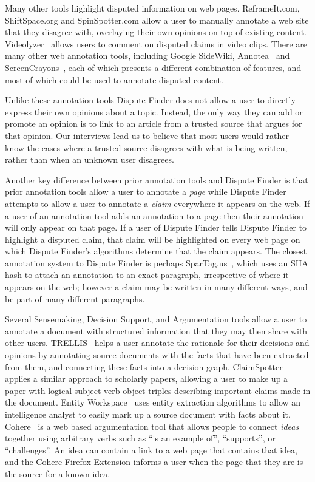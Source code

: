 \documentclass{www2010-submission}
\begin{document}
Many other tools highlight disputed information on web pages. ReframeIt.com, ShiftSpace.org and SpinSpotter.com allow a user to manually annotate a web site that they disagree with, overlaying their own opinions on top of existing content. Videolyzer~\cite{Diakopoulos2008} allows users to comment on disputed claims in video clips. There are many other web annotation tools, including Google SideWiki, Annotea~\cite{Koivunen2001} and ScreenCrayons~\cite{Olsen2004}, each of which presents a different combination of features, and most of which could be used to annotate disputed content.

Unlike these annotation tools Dispute Finder does not allow a user to directly express their own opinions about a topic. Instead, the only way they can add or promote an opinion is to link to an article from a trusted source that argues for that opinion. Our interviews lead us to believe that most users would rather know the cases where a trusted source disagrees with what is being written, rather than when an unknown user disagrees.

Another key difference between prior annotation tools and Dispute Finder is that prior annotation tools allow a user to annotate a {\it page} while Dispute Finder attempts to allow a user to annotate a {\it claim} everywhere it appears on the web. If a user of an annotation tool adds an annotation to a page then their annotation will only appear on that page. If a user of Dispute Finder tells Dispute Finder to highlight a disputed claim, that claim will be highlighted on every web page on which Dispute Finder's algorithms determine that the claim appears. The closest annotation system to Dispute Finder is perhaps SparTag.us~\cite{Hong2009}, which uses an SHA hash to attach an annotation to an exact paragraph, irrespective of where it appears on the web; however a claim may be written in many different ways, and be part of many different paragraphs.

Several Sensemaking, Decision Support, and Argumentation tools allow a user to annotate a document with structured information that they may then share with other users. TRELLIS~\cite{Gil2002} helps a user annotate the rationale for their decisions and opinions by annotating source documents with the facts that have been extracted from them, and connecting these facts into a decision graph. ClaimSpotter~\cite{Sereno2005,Sereno2004} applies a similar approach to scholarly papers, allowing a user to make up a paper with logical subject-verb-object triples describing important claims made in the document. Entity Workspace~\cite{Bier2006} uses entity extraction algorithms to allow an intelligence analyst to easily mark up a source document with facts about it. Cohere~\cite{Shum2008} is a web based argumentation tool that allows people to connect {\it ideas} together using arbitrary verbs such as ``is an example of'', ``supports'', or ``challenges''. An idea can contain a link to a web page that contains that idea, and the Cohere Firefox Extension informs a user when the page that they are is the source for a known idea.
\end{document}
